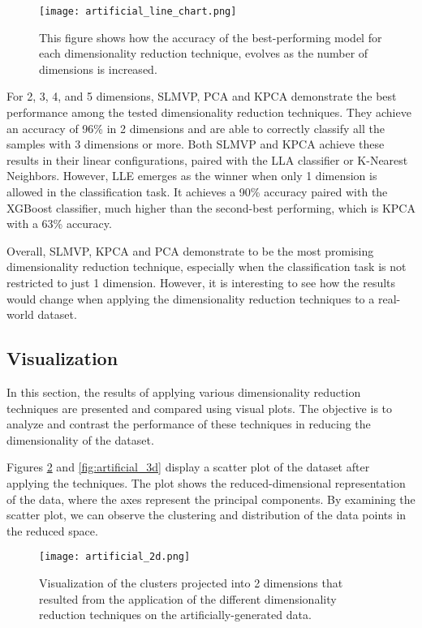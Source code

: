 \begin{figure}
    \centering
    \texttt{[image: artificial\_line\_chart.png]}
    \caption{This figure shows how the accuracy of the best-performing model for each dimensionality reduction technique, evolves as the number of dimensions is increased.}
    \label{fig:art_line_chart}
\end{figure}

For 2, 3, 4, and 5 dimensions, SLMVP, PCA and KPCA demonstrate the best performance among the tested dimensionality reduction techniques. They achieve an accuracy of 96\% in 2 dimensions and are able to correctly classify all the samples with 3 dimensions or more. Both SLMVP and KPCA achieve these results in their linear configurations, paired with the LLA classifier or K-Nearest Neighbors.
However, LLE emerges as the winner when only 1 dimension is allowed in the classification task. It achieves a 90\% accuracy paired with the XGBoost classifier, much higher than the second-best performing, which is KPCA with a 63\% accuracy.

Overall, SLMVP, KPCA and PCA demonstrate to be the most promising dimensionality reduction technique, especially when the classification task is not restricted to just 1 dimension. However, it is interesting to see how the results would change when applying the dimensionality reduction techniques to a real-world dataset.

\subsection{Visualization}

In this section, the results of applying various dimensionality reduction techniques are presented and compared using visual plots. The objective is to analyze and contrast the performance of these techniques in reducing the dimensionality of the dataset.

Figures \ref{fig:artificial_2d} and \ref{fig:artificial_3d} display a scatter plot of the dataset after applying the techniques. The plot shows the reduced-dimensional representation of the data, where the axes represent the principal components. By examining the scatter plot, we can observe the clustering and distribution of the data points in the reduced space.

\begin{figure}[!h]
    \centering
    \texttt{[image: artificial\_2d.png]}
    \caption{Visualization of the clusters projected into 2 dimensions that resulted from the application of the different dimensionality reduction techniques on the artificially-generated data.}
    \label{fig:artificial_2d}
\end{figure}

